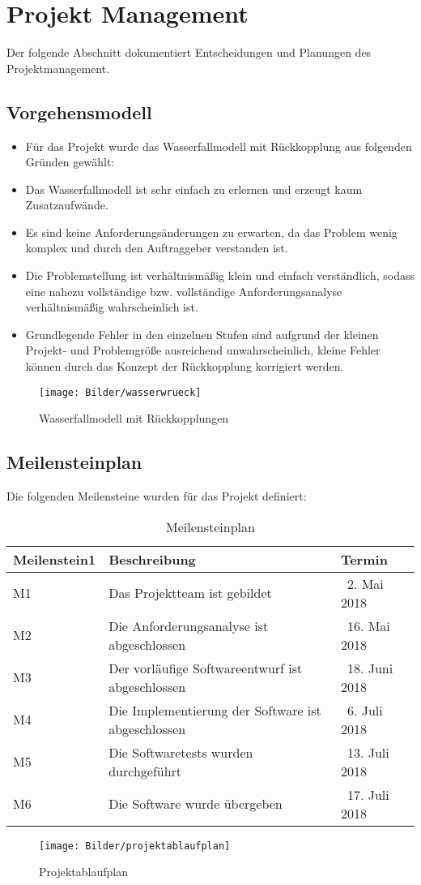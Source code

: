 \documentclass{scrartcl}
\begin{document}
\section {Projekt Management}
Der folgende Abschnitt dokumentiert Entscheidungen und Planungen des Projektmanagement.

\subsection{Vorgehensmodell}
\begin{itemize}
\item Für das Projekt wurde das Wasserfallmodell mit Rückkopplung aus folgenden Gründen gewählt:
\item Das Wasserfallmodell ist sehr einfach zu erlernen und erzeugt kaum Zusatzaufwände.
\item Es sind keine Anforderungsänderungen zu erwarten, da das Problem wenig komplex und durch den Auftraggeber verstanden ist.
\item Die Problemstellung ist verhältnismäßig klein und einfach verständlich, sodass eine nahezu vollständige bzw. vollständige Anforderungsanalyse verhältnismäßig wahrscheinlich ist.
\item Grundlegende Fehler in den einzelnen Stufen sind aufgrund der kleinen Projekt- und Problemgröße ausreichend unwahrscheinlich, kleine Fehler können durch das Konzept der Rückkopplung korrigiert werden.
\end{itemize}

\begin{figure}
	\texttt{[image: Bilder/wasserwrueck]}
	\caption{Wasserfallmodell mit Rückkopplungen}
	\label{fig:wasserwrueck}
\end{figure}

\subsection{Meilensteinplan}
Die folgenden Meilensteine wurden für das Projekt definiert:

\begin{table}[h]
	\begin{tabular}{l|l|l}
	Meilenstein1 & Beschreibung & Termin \\
	\hline
	M1 & Das Projektteam ist gebildet & 2. Mai 2018 \\
	\hline
	M2 & Die Anforderungsanalyse ist abgeschlossen & 16. Mai 2018 \\
	\hline
	M3 & Der vorläufige Softwareentwurf ist abgeschlossen & 18. Juni 2018 \\
	\hline
	M4 & Die Implementierung der Software ist abgeschlossen & 6. Juli 2018 \\
	\hline
	M5 & Die Softwaretests wurden durchgeführt & 13. Juli 2018 \\
	\hline
	M6 & Die Software wurde übergeben & 17. Juli 2018 \\
	\hline
	\end{tabular}
	\caption{Meilensteinplan}
	\label{tab:Meilensteinplan}
\end{table}

\begin{figure}
	\texttt{[image: Bilder/projektablaufplan]}
	\caption{Projektablaufplan}
	\label{fig:projektablaufplan}
\end{figure}
\end{document}
